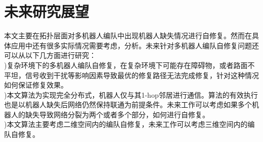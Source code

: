 \section{未来研究展望}
本文主要在拓扑层面对多机器人编队中出现机器人缺失情况进行自修复。然而在具体应用中还有很多实际情况需要考虑，分析。未来针对多机器人编队自修复问题还可以从以下几方面进行研究：\\
)复杂环境下的多机器人编队自修复，在复杂环境下可能存在障碍物，或者路面不平坦，信号收到干扰等影响因素导致最优的修复路径无法完成修复，针对这种情况如何保证修复效果。\\
)本文算法为实现完全分布式，机器人仅与其1-hop邻居进行通信。算法的有效执行也是以机器人缺失后网络仍然保持联通为前提条件。未来工作可以考虑如果多个机器人的缺失导致网络分裂为两个或者多个部分，如何进行自修复。\\
)本文算法主要考虑二维空间内的编队自修复，未来工作可以考虑三维空间内的编队自修复。